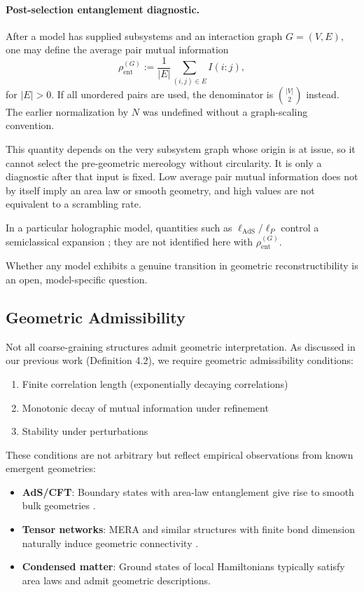 \documentclass[12pt,a4paper]{article}
\begin{document}
\paragraph{Post-selection entanglement diagnostic.}
After a model has supplied subsystems and an interaction graph $G=(V,E)$, one may define the average pair mutual information
\begin{equation}
\rho_{\mathrm{ent}}^{(G)}
:=\frac{1}{|E|}\sum_{(i,j)\in E} I(i:j),
\end{equation}
for $|E|>0$.  If all unordered pairs are used, the denominator is $\binom{|V|}{2}$ instead.  The earlier normalization by $N$ was undefined without a graph-scaling convention.

This quantity depends on the very subsystem graph whose origin is at issue, so it cannot select the pre-geometric mereology without circularity.  It is only a diagnostic after that input is fixed.  Low average pair mutual information does not by itself imply an area law or smooth geometry, and high values are not equivalent to a scrambling rate.

In a particular holographic model, quantities such as $\ell_{\mathrm{AdS}}/\ell_P$ control a semiclassical expansion \cite{Maldacena1999}; they are not identified here with $\rho_{\mathrm{ent}}^{(G)}$.

Whether any model exhibits a genuine transition in geometric reconstructibility is an open, model-specific question.

\subsection{Geometric Admissibility}

Not all coarse-graining structures admit geometric interpretation. As discussed in our previous work (Definition 4.2), we require geometric admissibility conditions:
\begin{enumerate}
\item Finite correlation length (exponentially decaying correlations)
\item Monotonic decay of mutual information under refinement
\item Stability under perturbations
\end{enumerate}

These conditions are not arbitrary but reflect empirical observations from known emergent geometries:
\begin{itemize}
\item \textbf{AdS/CFT}: Boundary states with area-law entanglement give rise to smooth bulk geometries \cite{RyuTakayanagi2006}.
\item \textbf{Tensor networks}: MERA and similar structures with finite bond dimension naturally induce geometric connectivity \cite{Swingle2012}.
\item \textbf{Condensed matter}: Ground states of local Hamiltonians typically satisfy area laws and admit geometric descriptions.
\end{itemize}
\end{document}
